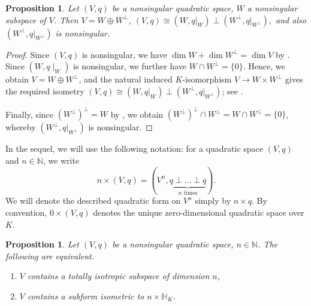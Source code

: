\documentclass[12pt, leqno, british]{amsart}
\theoremstyle{definition}
\theoremstyle{plain}
\newtheorem{prop}[defi]{Proposition}
\theoremstyle{remark}
\newcommand{\mbb}{\mathbb}
\newcommand{\nat}{\mbb N}
\begin{document}
\begin{prop}\label{P:splitting-off}
Let $(V, q)$ be a nonsingular quadratic space, $W$ a nonsingular subspace of $V$.
Then $V = W \oplus W^\perp$,
$(V, q) \cong (W, q\vert_W) \perp (W^\perp, q\vert_{W^\perp}),$
and also $(W^\perp, q\vert_{W^\perp})$ is nonsingular.
\end{prop}
\begin{proof}
Since $(V, q)$ is nonsingular, we have $\dim W + \dim W^\perp = \dim V$ by .
Since $(W, q\mid_W)$ is nonsingular, we further have $W \cap W^\perp = \lbrace 0 \rbrace$.
Hence, we obtain $V = W \oplus W^\perp$, and the natural induced $K$-isomorphism $V \to W \times W^\perp$ gives the required isometry $(V, q) \cong (W, q\vert_W) \perp (W^\perp, q\vert_{W^\perp})$; see .

Finally, since $(W^\perp)^\perp = W$ by , we obtain $(W^\perp)^\perp \cap W^\perp = W \cap W^\perp = \lbrace 0 \rbrace$, whereby $(W^\perp, q\vert_{W^\perp})$ is nonsingular.
\end{proof}
In the sequel, we will use the following notation: for a quadratic space $(V, q)$ and $n \in \nat$, we write
$$ n \times (V, q) = (V^n, \underbrace{q \perp \ldots \perp q}_{n \text{ times}}).$$
We will denote the described quadratic form on $V^n$ simply by $n \times q$.
By convention, $0 \times (V, q)$ denotes the unique zero-dimensional quadratic space over $K$.
\begin{prop}\label{P:hyperbolic-form}
Let $(V, q)$ be a nonsingular quadratic space, $n \in \nat$.
The following are equivalent.
\begin{enumerate}
\item\label{it:hyperbolic-form-1} $V$ contains a totally isotropic subspace of dimension $n$,
\item\label{it:hyperbolic-form-2} $V$ contains a subform isometric to $n \times \mbb{H}_K$.
\end{enumerate}
\end{prop}
\end{document}

